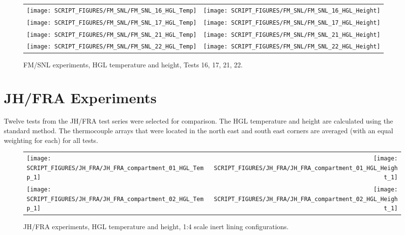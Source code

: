 \begin{figure}[p]
\begin{tabular*}{\textwidth}{l@{\extracolsep{\fill}}r}
\texttt{[image: SCRIPT\_FIGURES/FM\_SNL/FM\_SNL\_16\_HGL\_Temp]} &
\texttt{[image: SCRIPT\_FIGURES/FM\_SNL/FM\_SNL\_16\_HGL\_Height]} \\
\texttt{[image: SCRIPT\_FIGURES/FM\_SNL/FM\_SNL\_17\_HGL\_Temp]} &
\texttt{[image: SCRIPT\_FIGURES/FM\_SNL/FM\_SNL\_17\_HGL\_Height]} \\
\texttt{[image: SCRIPT\_FIGURES/FM\_SNL/FM\_SNL\_21\_HGL\_Temp]} &
\texttt{[image: SCRIPT\_FIGURES/FM\_SNL/FM\_SNL\_21\_HGL\_Height]} \\
\texttt{[image: SCRIPT\_FIGURES/FM\_SNL/FM\_SNL\_22\_HGL\_Temp]} &
\texttt{[image: SCRIPT\_FIGURES/FM\_SNL/FM\_SNL\_22\_HGL\_Height]}
\end{tabular*}
\caption[FM/SNL experiments, HGL temperature and height, Tests 16, 17, 21, 22]
{FM/SNL experiments, HGL temperature and height, Tests 16, 17, 21, 22.}
\label{FM_SNL_HGL_5}
\end{figure}

\clearpage


\clearpage

\section{JH/FRA Experiments}

Twelve tests from the JH/FRA test series were selected for comparison. The HGL temperature and height are calculated using the standard method. The thermocouple arrays that were located in the north east and south east corners are averaged (with an equal weighting for each) for all tests.


\begin{figure}[!h]
\begin{tabular*}{\textwidth}{l@{\extracolsep{\fill}}r}
\texttt{[image: SCRIPT\_FIGURES/JH\_FRA/JH\_FRA\_compartment\_01\_HGL\_Temp\_1]} &
\texttt{[image: SCRIPT\_FIGURES/JH\_FRA/JH\_FRA\_compartment\_01\_HGL\_Height\_1]} \\
\texttt{[image: SCRIPT\_FIGURES/JH\_FRA/JH\_FRA\_compartment\_02\_HGL\_Temp\_1]} &
\texttt{[image: SCRIPT\_FIGURES/JH\_FRA/JH\_FRA\_compartment\_02\_HGL\_Height\_1]} \\
\end{tabular*}
\caption[JH/FRA experiments, HGL temperature and height, 1:4 scale inert lining configurations]
{JH/FRA experiments, HGL temperature and height, 1:4 scale inert lining configurations.}
\label{JH_FRA_HGL_1}
\end{figure}


